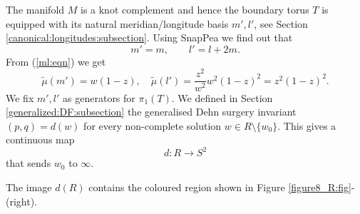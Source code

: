 The manifold $M$ is a knot complement and hence the boundary torus $T$ is equipped with its natural meridian/longitude basis $m',l'$, see Section \ref{canonical:longitudes:subsection}. Using SnapPea we find out that
$$m'=m, \qquad l'=l+2m.$$
From (\ref{ml:eqn}) we get
\begin{equation} \label{mlp:eqn}
 \tilde\mu(m') = w(1-z), \quad \tilde\mu(l') = \frac{z^2}{w^2} w^2(1-z)^2 = z^2(1-z)^2. 
\end{equation}
We fix $m',l'$ as generators for $\pi_1(T)$. We defined in Section \ref{generalized:DF:subsection} the generalised Dehn surgery invariant $(p,q) = d(w)$ for every non-complete solution $w\in R \setminus \{w_0\}$. This gives a continuous map
$$d \colon R \longrightarrow S^2$$
that sends $w_0$ to $\infty$.
\begin{prop}
The image $d(R)$ contains the coloured region shown in Figure \ref{figure8_R:fig}-(right).
\end{prop}
